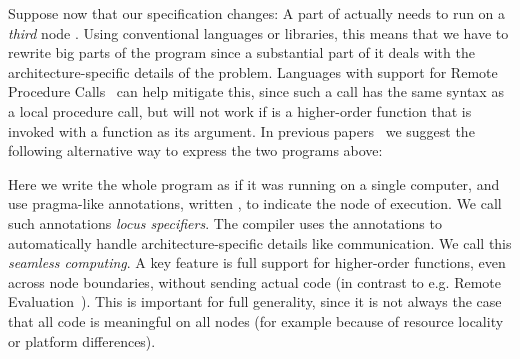 \documentclass{article}
\theoremstyle{definition}
\newcommand{\Conid}[1]{\mathit{#1}}
\newcommand{\Varid}[1]{\mathit{#1}}
\def\resethooks{\global\let\SaveRestoreHook\empty
  \global\let\ColumnHook\empty}
\let\hspost\empty
\renewcommand\Varid[1]{\mathord{\textsf{#1}}}
\let\Conid\Varid
\newcommand\Keyword[1]{\textsf{\textbf{#1}}}
\newcommand\MyConid[1]{\mathord{\textsf{\textbf{#1}}}}
\renewcommand\Keyword[1]{\textsf{\underline{#1}}}
\renewcommand\Varid[1]{\textsf{#1}}
\begin{document}
Suppose now that our specification changes: A part {\textsmaller[.5]{\ensuremath{\Conid{F'}}}} of {\textsmaller[.5]{\ensuremath{\Conid{F}}}} actually needs
to run on a \emph{third} node {\textsmaller[.5]{\ensuremath{\Conid{C}}}}. Using conventional languages or libraries,
this means that we have to rewrite big parts of the program since a substantial
part of it deals with the architecture-specific details of the problem.
Languages with support for Remote Procedure
Calls~\cite{DBLP:journals/tocs/BirrelN84} can help mitigate this, since
such a call has the same syntax as a local procedure call, but will
not work if {\textsmaller[.5]{\ensuremath{\Conid{F'}}}} is a higher-order function that is invoked with a function
as its argument.
In previous
papers~\cite{DBLP:conf/lics/FredrikssonG13,DBLP:conf/tgc/FredrikssonG12} we
suggest the following alternative way to express the two programs above:
\resethooks
Here we write the whole program as if it was running on a single computer, and
use pragma-like annotations, written {\textsmaller[.5]{\ensuremath{\{\mskip1.5mu \Varid{x}\mskip1.5mu\}\;\MyConid{}\;\Conid{A}}}}, to indicate the node of
execution. We call such annotations \emph{locus specifiers}. The compiler uses
the annotations to automatically handle architecture-specific details like
communication. We call this \emph{seamless computing}.  A key feature is full
support for higher-order functions, even across node boundaries, without
sending actual code (in contrast to e.g. Remote
Evaluation~\cite{DBLP:journals/toplas/StamosG90}). This is important for full
generality, since it is not always the case that all code is meaningful on all
nodes (for example because of resource locality or platform differences).
\end{document}
